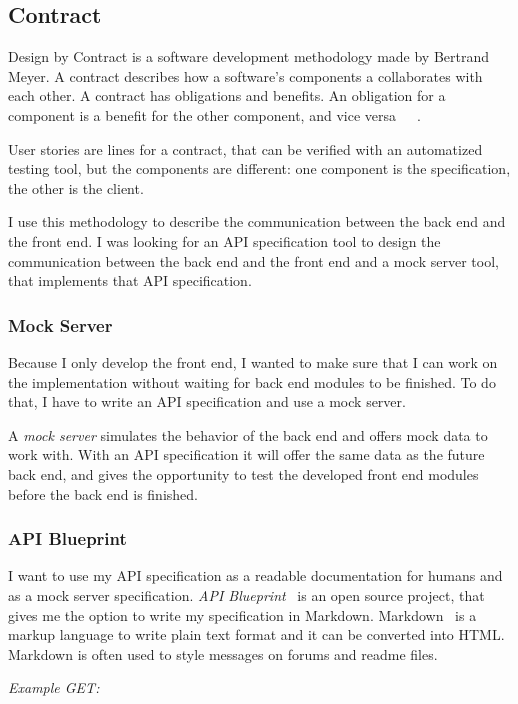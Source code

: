 \subsection{Contract}
Design by Contract is a software development methodology made by Bertrand Meyer. A contract describes how a software's components a collaborates with each other. A contract has obligations and benefits. An obligation for a component is a benefit for the other component, and vice versa~\cite{touch-of-class}~\cite{Szepes-onlab}~\cite{szofttech}.

User stories are lines for a contract, that can be verified with an automatized testing tool, but the components are different: one component is the specification, the other is the client.

I use this methodology to describe the communication between the back end and the front end. I was looking for an API specification tool to design the communication between the back end and the front end and a mock server tool, that implements that API specification.

\subsubsection{Mock Server}
Because I only develop the front end, I wanted to make sure that I can work on the implementation without waiting for back end modules to be finished. To do that, I have to write an API specification and use a mock server. 

A \emph{mock server} simulates the behavior of the back end and offers mock data to work with. With an API specification it will offer the same data as the future back end, and gives the opportunity to test the developed front end modules before the back end is finished.

\subsubsection{API Blueprint}
\label{api-blueprint}

I want to use my API specification as a readable documentation for humans and as a mock server specification. \emph{API Blueprint}~\cite{api-blueprint} is an open source project, that gives me the option to write my specification in Markdown. Markdown~\cite{markdown} is a markup language to write plain text format and it can be converted into HTML. Markdown is often used to style messages on forums and readme files. 

\emph{Example GET:}

